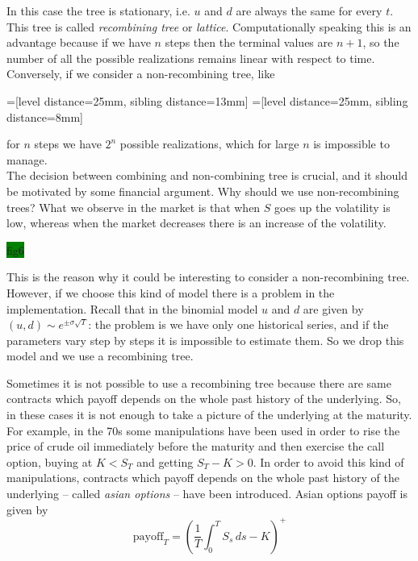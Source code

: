 In this case the tree is stationary, i.e. $u$ and $d$ are always the same for every $t$. This tree is called \emph{recombining tree} or \emph{lattice}. Computationally speaking this is an advantage because if we have $n$ steps then the terminal values are $n+1$, so the number of all the possible realizations remains linear with respect to time.\\
Conversely, if we consider a non-recombining tree, like
\begin{center}
=[level distance=25mm, sibling distance=13mm]
=[level distance=25mm, sibling distance=8mm]
\end{center}
for $n$ steps we have $2^n$ possible realizations, which for large $n$ is impossible to manage.\\
The decision between combining and non-combining tree is crucial, and it should be motivated by some financial argument. Why should we use non-recombining trees? What we observe in the market is that when $S$ goes up the volatility is low, whereas when the market decreases there is an increase of the volatility.
\begin{center}
    \colorbox{green}{fig6}
\end{center}
This is the reason why it could be interesting to consider a non-recombining tree. However, if we choose this kind of model there is a problem in the implementation. Recall that in the binomial model $u$ and $d$ are given by $(u,d)\sim e^{\pm\sigma\sqrt{T}}$: the problem is we have only one historical series, and if the parameters vary step by steps it is impossible to estimate them. So we drop this model and we use a recombining tree.
\begin{remark}
    Sometimes it is not possible to use a recombining tree because there are same contracts which payoff depends on the whole past history of the underlying. So, in these cases it is not enough to take a picture of the underlying at the maturity. For example, in the 70s some manipulations have been used in order to rise the price of crude oil immediately before the maturity and then exercise the call option, buying at $K<S_T$ and getting $S_T-K>0$. In order to avoid this kind of manipulations, contracts which payoff depends on the whole past history of the underlying -- called \emph{asian options} -- have been introduced. Asian options payoff is given by
    \begin{equation}
        \mbox{payoff}_T = \left(\dfrac{1}{T}\int^T_0 S_s\,ds-K\right)^+
    \end{equation}
\end{remark}